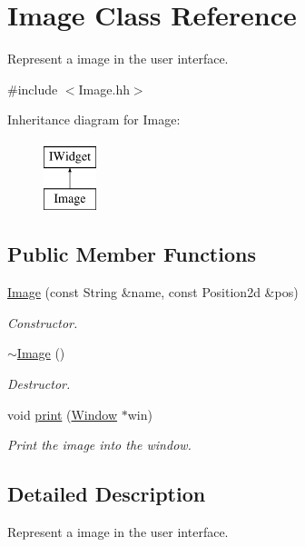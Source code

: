 \hypertarget{classImage}{}\section{Image Class Reference}
\label{classImage}


Represent a image in the user interface.  




{\ttfamily \#include $<$Image.\+hh$>$}

Inheritance diagram for Image\+:\begin{figure}[H]
\begin{center}
\leavevmode
\includegraphics[height=2.000000cm]{classImage}
\end{center}
\end{figure}
\subsection*{Public Member Functions}
\begin{DoxyCompactItemize}
\item 
\hyperlink{classImage_aca308a45e7c53ec95e244863cb31a738}{Image} (const String \&name, const Position2d \&pos)
\begin{DoxyCompactList}\small\item\em Constructor. \end{DoxyCompactList}\item 
\hyperlink{classImage_a0294f63700543e11c0f0da85601c7ae5}{$\sim$\+Image} ()
\begin{DoxyCompactList}\small\item\em Destructor. \end{DoxyCompactList}\item 
void \hyperlink{classImage_aca043fb78326d6ce135498419e2d1833}{print} (\hyperlink{classWindow}{Window} $\ast$win)
\begin{DoxyCompactList}\small\item\em Print the image into the window. \end{DoxyCompactList}\end{DoxyCompactItemize}


\subsection{Detailed Description}
Represent a image in the user interface. 

